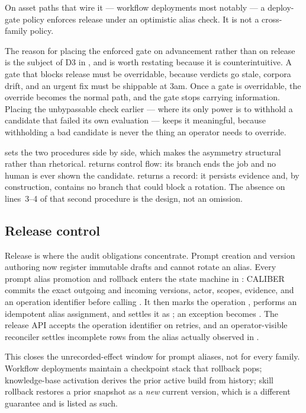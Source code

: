  On asset paths that wire it --- workflow
deployments most notably --- a deploy-gate policy enforces release under an
optimistic alias check. It is not a cross-family policy.

The reason for placing the enforced gate on advancement rather than on release is
the subject of D3 in , and is worth restating because it is
counterintuitive. A gate that blocks release must be overridable, because verdicts
go stale, corpora drift, and an urgent fix must be shippable at 3am. Once a gate is
overridable, the override becomes the normal path, and the gate stops carrying
information. Placing the unbypassable check earlier --- where its only power is to
withhold a candidate that failed its own evaluation --- keeps it meaningful, because
withholding a bad candidate is never the thing an operator needs to override.

 sets the two procedures side by side, which makes the asymmetry
structural rather than rhetorical.  returns control flow: its
 branch ends the job and no human is ever shown the candidate.
 returns a record: it persists evidence and, by construction,
contains no branch that could block a rotation. The absence on lines~3--4 of that
second procedure is the design, not an omission.

\subsection{Release control}



Release is where the audit obligations concentrate. Prompt creation and version
authoring now register immutable drafts and cannot rotate an alias. Every prompt
alias promotion and rollback enters the state machine in :
CALIBER commits the exact outgoing and incoming versions, actor, scopes, evidence,
and an operation identifier before calling \mlflow{}. It then marks the operation
, performs an idempotent alias assignment, and settles it as
; an exception becomes . The release API
accepts the operation identifier on retries, and an operator-visible reconciler
settles incomplete rows from the alias actually observed in \mlflow{}.

This closes the unrecorded-effect window for prompt aliases, not for every family.
Workflow deployments maintain a checkpoint stack that rollback pops; knowledge-base
activation derives the prior active build from history; skill rollback restores a
prior snapshot as a \emph{new} current version, which is a different guarantee and
is listed as such.

